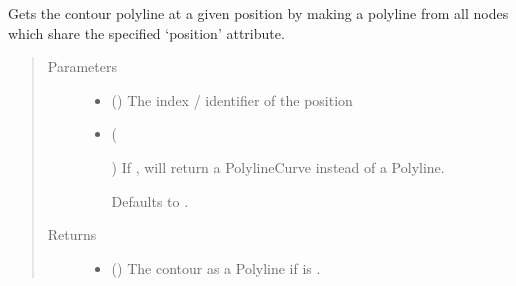 \documentclass[letterpaper,10pt,english]{sphinxmanual}
\begin{document}
\begin{fulllineitems}
\begin{fulllineitems}
\begin{quote}
\begin{description}
\end{description}\end{quote}

\end{fulllineitems}


\begin{fulllineitems}
\label{\detokenize{cockatoo:cockatoo.KnitNetworkBase.geometry_at_position_contour}}
Gets the contour polyline at a given position by making a polyline
from all nodes which share the specified ‘position’ attribute.
\begin{quote}\begin{description}
\item[{Parameters}] \leavevmode\begin{itemize}
\item {} 
 () \textendash{} The index / identifier of the position

\item {} 
 (%
\begin{footnote}[87]\sphinxAtStartFootnote
{}
%
\end{footnote}\sphinxstyleliteralemphasis{\sphinxupquote{, }}) \textendash{} 
If , will return a PolylineCurve instead of a Polyline.

Defaults to .


\end{itemize}

\item[{Returns}] \leavevmode
\begin{itemize}
\item {} 
 () \textendash{} The contour as a Polyline if  is .


\end{itemize}
\end{description}
\end{quote}
\end{fulllineitems}
\end{fulllineitems}
\end{document}
